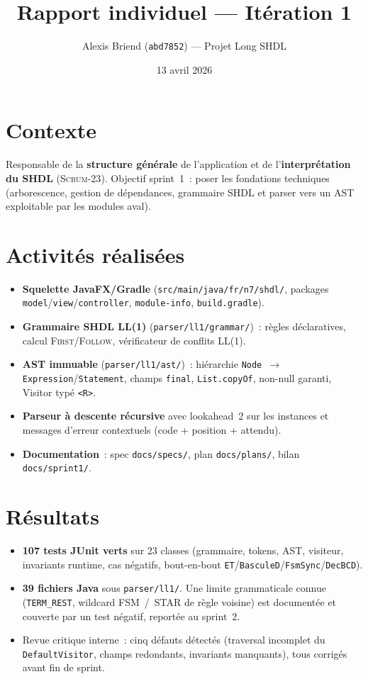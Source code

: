 \documentclass[11pt,a4paper]{article}
\title{\vspace{-1.5cm}Rapport individuel --- It\'eration 1}
\author{Alexis Briend (\texttt{abd7852}) --- Projet Long SHDL}
\date{13 avril 2026}
\begin{document}
\maketitle
\vspace{-2em}

\section*{Contexte}
Responsable de la \textbf{structure g\'en\'erale} de l'application et de l'\textbf{interpr\'etation du SHDL} (\textsc{Scrum-23}). Objectif sprint~1~: poser les fondations techniques (arborescence, gestion de d\'ependances, grammaire SHDL et parser vers un AST exploitable par les modules aval).

\section*{Activit\'es r\'ealis\'ees}
\begin{itemize}
  \item \textbf{Squelette JavaFX/Gradle} (\texttt{src/main/java/fr/n7/shdl/}, packages \texttt{model}/\texttt{view}/\texttt{controller}, \texttt{module-info}, \texttt{build.gradle}).
  \item \textbf{Grammaire SHDL LL(1)} (\texttt{parser/ll1/grammar/})~: r\`egles d\'eclaratives, calcul \textsc{First}/\textsc{Follow}, v\'erificateur de conflits LL(1).
  \item \textbf{AST immuable} (\texttt{parser/ll1/ast/})~: hi\'erarchie \texttt{Node $\to$ Expression}/\texttt{Statement}, champs \texttt{final}, \texttt{List.copyOf}, non-null garanti, Visitor typ\'e \texttt{<R>}.
  \item \textbf{Parseur \`a descente r\'ecursive} avec lookahead~2 sur les instances et messages d'erreur contextuels (code + position + attendu).
  \item \textbf{Documentation}~: spec \texttt{docs/specs/}, plan \texttt{docs/plans/}, bilan \texttt{docs/sprint1/}.
\end{itemize}

\section*{R\'esultats}
\begin{itemize}
  \item \textbf{107 tests JUnit verts} sur 23 classes (grammaire, tokens, AST, visiteur, invariants runtime, cas n\'egatifs, bout-en-bout \texttt{ET}/\texttt{BasculeD}/\texttt{FsmSync}/\texttt{DecBCD}).
  \item \textbf{39 fichiers Java} sous \texttt{parser/ll1/}. Une limite grammaticale connue (\texttt{TERM\_REST}, wildcard FSM~/~STAR de r\`egle voisine) est document\'ee et couverte par un test n\'egatif, report\'ee au sprint~2.
  \item Revue critique interne~: cinq d\'efauts d\'etect\'es (traversal incomplet du \texttt{DefaultVisitor}, champs redondants, invariants manquants), tous corrig\'es avant fin de sprint.
\end{itemize}
\end{document}
